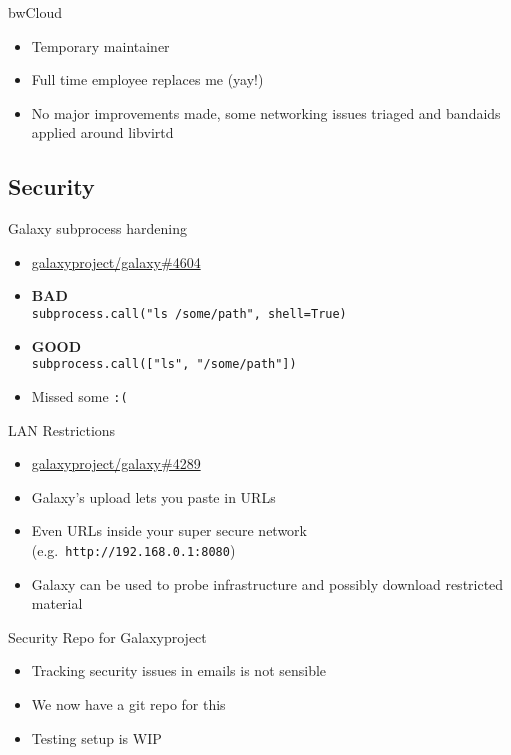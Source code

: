 \documentclass[12pt]{ufrslides}
\newcommand{\ghpr}[3]{\href{https://github.com/#1/#2/pull/#3}{#1/#2\##3}}
\begin{document}
	\begin{frame}{bwCloud}
		\begin{itemize}
			\item Temporary maintainer
			\item Full time employee replaces me (yay!)
			\item No major improvements made, some networking issues triaged and bandaids applied around libvirtd
		\end{itemize}
	\end{frame}

\subsection{Security}

	\begin{frame}{Galaxy subprocess hardening}
		\begin{itemize}
			\item \ghpr{galaxyproject}{galaxy}{4604}
			\item \textbf{BAD}\\ \texttt{subprocess.call("ls /some/path", shell=True)}
			\item \textbf{GOOD}\\ \texttt{subprocess.call(["ls", "/some/path"])}
			\item Missed some \texttt{:(}
		\end{itemize}
	\end{frame}

	\begin{frame}{LAN Restrictions}
		\begin{itemize}
			\item \ghpr{galaxyproject}{galaxy}{4289}
			\item Galaxy's upload lets you paste in URLs
			\item Even URLs inside your super secure network (e.g.~\texttt{http://192.168.0.1:8080})
			\item Galaxy can be used to probe infrastructure and possibly download restricted material
		\end{itemize}
	\end{frame}

	\begin{frame}{Security Repo for Galaxyproject}
		\begin{itemize}
			\item Tracking security issues in emails is not sensible
			\item We now have a git repo for this
			\item Testing setup is WIP
		\end{itemize}
	\end{frame}
\end{document}
